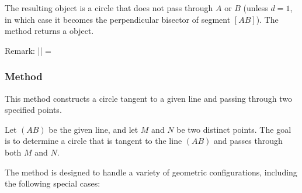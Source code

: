 \noindent
The resulting object is a circle that does not pass through $A$ or $B$ (unless $d = 1$, in which case it becomes the perpendicular bisector of segment $[AB]$). The method returns a  object.

\vspace{1em}

\begin{tkzexample}[vbox]

\begin{center}
\end{center}
\end{tkzexample}


Remark: || = 

\subsubsection{Method } %
\label{ssub:c_l_pp}

This method constructs a circle tangent to a given line and passing through two specified points.

\medskip
\noindent
Let $(AB)$ be the given line, and let $M$ and $N$ be two distinct points. The goal is to determine a circle that is tangent to the line $(AB)$ and passes through both $M$ and $N$.

\medskip
\noindent
The method is designed to handle a variety of geometric configurations, including the following special cases:

